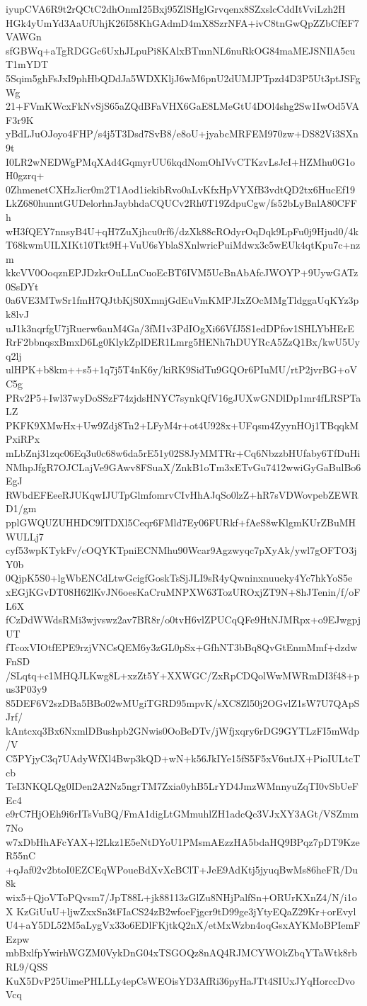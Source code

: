 iyupCVA6R9t2rQCtC2dhOnmI25Bxj95ZlSHglGrvqenx8SZxslcCddItVviLzh2H
HGk4yUmYd3AaUfUhjK26I58KhGAdmD4mX8SzrNFA+ivC8tnGwQpZZbCfEF7VAWGn
sfGBWq+aTgRDGGc6UxhJLpuPi8KAlxBTmnNL6nuRkOG84maMEJSNIlA5cuT1mYDT
5Sqim5ghFsJxI9phHbQDdJa5WDXKljJ6wM6pnU2dUMJPTpzd4D3P5Ut3ptJSFgWg
21+FVmKWcxFkNvSjS65aZQdBFaVHX6GaE8LMeGtU4DOl4shg2Sw1IwOd5VAF3r9K
yBdLJuOJoyo4FHP/s4j5T3Dsd7SvB8/e8oU+jyabcMRFEM970zw+DS82Vi3SXn9t
I0LR2wNEDWgPMqXAd4GqmyrUU6kqdNomOhIVvCTKzvLsJcI+HZMhu0G1oH0gzrq+
0ZhmenetCXHzJicr0m2T1Aod1iekibRvo0aLvKfxHpVYXfB3vdtQD2tx6HucEf19
LkZ680hunntGUDelorhnJaybhdaCQUCv2Rh0T19ZdpuCgw/fs52bLyBnlA80CFFh
wH3fQEY7nnsyB4U+qH7ZuXjhcu0rf6/dzXk88cROdyrOqDqk9LpFu0j9Hjud0/4k
T68kwmUILXIKt10Tkt9H+VuU6sYblaSXnlwricPuiMdwx3c5wEUk4qtKpu7c+nzm
kkcVV0OoqznEPJDzkrOuLLnCuoEcBT6IVM5UcBnAbAfcJWOYP+9UywGATz0SsDYt
0a6VE3MTwSr1fmH7QJtbKjS0XmnjGdEuVmKMPJIxZOcMMgTldggaUqKYz3pk8lvJ
uJ1k3nqrfgU7jRuerw6auM4Ga/3fM1v3PdIOgXi66VfJ5S1edDPfov1SHLYbHErE
RrF2bbnqsxBmxD6Lg0KlykZplDER1Lmrg5HENh7hDUYRcA5ZzQ1Bx/kwU5Uyq2lj
ulHPK+b8km++s5+1q7j5T4nK6y/kiRK9SidTu9GQOr6PIuMU/rtP2jvrBG+oVC5g
PRv2P5+Iwl37wyDoSSzF74zjdsHNYC7synkQfV16gJUXwGNDlDp1mr4fLRSPTaLZ
PKFK9XMwHx+Uw9Zdj8Tn2+LFyM4r+ot4U928x+UFqsm4ZyynHOj1TBqqkMPxiRPx
mLbZnj31zqc06Eq3u0c68w6da5rE51y02S8JyMMTRr+Cq6NbzzbHUfaby6TfDuHi
NMhpJfgR7OJCLajVe9GAwv8FSuaX/ZnkB1oTm3xETvGu7412wwiGyGaBulBo6EgJ
RWbdEFEeeRJUKqwIJUTpGlmfomrvCIvHhAJqSo0lzZ+hR7sVDWovpebZEWRD1/gm
pplGWQUZUHHDC9lTDXl5Ceqr6FMld7Ey06FURkf+fAeS8wKlgmKUrZBuMHWULLj7
cyf53wpKTykFv/cOQYKTpniECNMhu90Wcar9Agzwyqc7pXyAk/ywl7gOFTO3jY0b
0QjpK5S0+lgWbENCdLtwGcigfGoskTsSjJLI9sR4yQwninxnuueky4Yc7hkYoS5e
xEGjKGvDT08H62lKvJN6oesKaCruMNPXW63TozUROxjZT9N+8hJTenin/f/oFL6X
fCzDdWWdsRMi3wjvswz2av7BR8r/o0tvH6vlZPUCqQFe9HtNJMRpx+o9EJwgpjUT
fTcoxVIOtfEPE9rzjVNCsQEM6y3zGL0pSx+GfhNT3bBq8QvGtEnmMmf+dzdwFnSD
/SLqtq+c1MHQJLKwg8L+xzZt5Y+XXWGC/ZxRpCDQolWwMWRmDI3f48+pus3P03y9
85DEF6V2szDBa5BBo02wMUgiTGRD95mpvK/sXC8Zl50j2OGvlZ1sW7U7QApSJrf/
kAntcxq3Bx6NxmlDBushpb2GNwis0OoBeDTv/jWfjxqry6rDG9GYTLzFI5mWdp/V
C5PYjyC3q7UAdyWfXl4Bwp3kQD+wN+k56JkIYe15fS5F5xV6utJX+PioIULtcTcb
TeI3NKQLQg0IDen2A2Nz5ngrTM7Zxia0yhB5LrYD4JmzWMnnyuZqTI0vSbUeFEc4
e9rC7HjOEh9i6rITsVuBQ/FmA1digLtGMmuhlZH1adcQc3VJxXY3AGt/VSZmm7No
w7xDbHhAFcYAX+l2Lkz1E5eNtDYoU1PMsmAEzzHA5bdaHQ9BPqz7pDT9KzeR55nC
+qJaf02v2btoI0EZCEqWPoueBdXvXcBClT+JeE9AdKtj5jyuqBwMs86heFR/Du8k
wix5+QjoVToPQvsm7/JpT88L+jk88113zGlZu8NHjPalfSn+ORUrKXnZ4/N/i1oX
KzGiUuU+ljwZxxSn3tFIaCS24zB2wfoeFjgcr9tD99ge3jYtyEQaZ29Kr+orEvyl
U4+aY5DL52M5aLygVx33o6EDlFKjtkQ2nX/etMxWzbn4oqGsxAYKMoBPIemFEzpw
mbBxlfpYwirhWGZM0VykDnG04xTSGOQz8nAQ4RJMCYWOkZbqYTaWtk8rbRL9/QSS
KuX5DvP25UimePHLLLy4epCsWEOisYD3AfRi36pyHaJTt4SIUxJYqHorccDvoVcq
